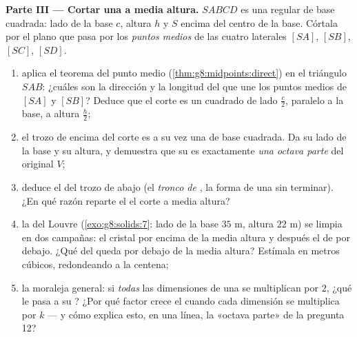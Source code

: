\begin{problem}
\medskip
\noindent\textbf{Parte III --- Cortar una  a media altura.}
$SABCD$ es una  regular de base cuadrada: lado de la base $c$, altura
$h$ y  $S$ encima del centro de la base. Córtala por el plano
que pasa por los \emph{puntos medios} de las cuatro  laterales $[SA]$,
$[SB]$, $[SC]$, $[SD]$.
\begin{enumerate}[resume]
  \item aplica el teorema del punto medio
        (\cref{thm:g8:midpoints:direct}) en el triángulo $SAB$:
        ¿cuáles son la dirección y la longitud del  que une
        los puntos medios de $[SA]$ y $[SB]$? Deduce que el corte
        es un cuadrado de lado $\frac{c}{2}$, paralelo a la base,
        a altura $\frac{h}{2}$;
  \item el trozo de encima del corte es a su vez una  de base cuadrada.
        Da su lado de la base y su altura, y demuestra que su 
        es exactamente \emph{una octava parte} del  original $V$;
  \item deduce el  del trozo de abajo (el \emph{tronco de },
        la forma de una  sin terminar). ¿En qué razón reparte
        el  el corte a media altura?
  \item la  del Louvre (\cref{exo:g8:solids:7}: lado de la base
        $35$ m, altura $22$ m) se limpia en dos campañas: el
        cristal por encima de la media altura y después el de por debajo. ¿Qué
         del \emph{} queda por debajo de la media altura?
        Estímala en metros cúbicos, redondeando a la centena;
  \item la moraleja general: si \emph{todas} las dimensiones de una
         se multiplican por $2$, ¿qué le pasa a su
        ? ¿Por qué factor crece el  cuando cada
        dimensión se multiplica por $k$ --- y cómo explica esto,
        en una línea, la «octava parte» de la pregunta 12?
\end{enumerate}
\end{problem}
